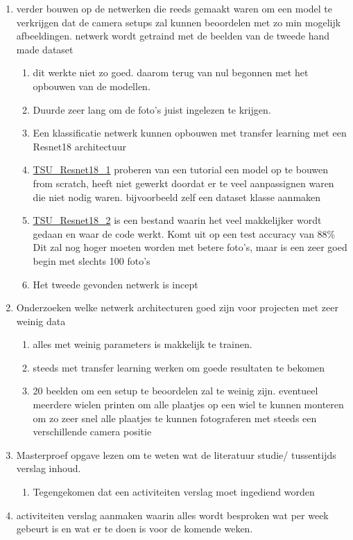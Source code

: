 \documentclass{scrartcl}
\begin{document}
\begin{enumerate}[1]
\item verder bouwen op de netwerken die reeds gemaakt waren om een model te verkrijgen dat de camera setups zal kunnen beoordelen met zo min mogelijk afbeeldingen. netwerk wordt getraind met de beelden van de tweede hand made dataset
	\begin{enumerate}[a]
	\item dit werkte niet zo goed. daarom terug van nul begonnen met het opbouwen van de modellen. 
	\item Duurde zeer lang om de foto's juist ingelezen te krijgen.
	\item Een klassificatie netwerk kunnen opbouwen met transfer learning met een Resnet18 architectuur
	\item \href{https://colab.research.google.com/drive/1iUkA7DjNarxSnYvV8T397PHwNeK0OGI1}{TSU\_Resnet18\_1} proberen van een tutorial een model op te bouwen from scratch, heeft niet gewerkt doordat er te veel aanpassignen waren die niet nodig waren. bijvoorbeeld zelf een dataset klasse aanmaken
	\item \href{https://colab.research.google.com/drive/1uh-lWXxS50Y3o4Fly4Wq9ZXmDzeXVAKN}{TSU\_Resnet18\_2} is een bestand waarin het veel makkelijker wordt gedaan en waar de code werkt. Komt uit op een test accuracy van 88\% Dit zal nog hoger moeten worden met betere foto's, maar is een zeer goed begin met slechts 100 foto's
	\item Het tweede gevonden netwerk is incept
	\end{enumerate}
\item Onderzoeken welke netwerk architecturen goed zijn voor projecten met zeer weinig data
	\begin{enumerate}[a]
	\item alles met weinig parameters is makkelijk te trainen. 
	\item steeds met transfer learning werken om goede resultaten te bekomen
	\item 20 beelden om een setup te beoordelen zal te weinig zijn. eventueel meerdere wielen printen om alle plaatjes op een wiel te kunnen monteren om zo zeer snel alle plaatjes te kunnen fotograferen met steeds een verschillende camera positie
	\end{enumerate}
\item Masterproef opgave lezen om te weten wat de literatuur studie/ tussentijds verslag inhoud.
	\begin{enumerate}[a]
	\item Tegengekomen dat een activiteiten verslag moet ingediend worden 
	\end{enumerate}
\item activiteiten verslag aanmaken waarin alles wordt besproken wat per week gebeurt is en wat er te doen is voor de komende weken.
\end{enumerate}
\end{document}
